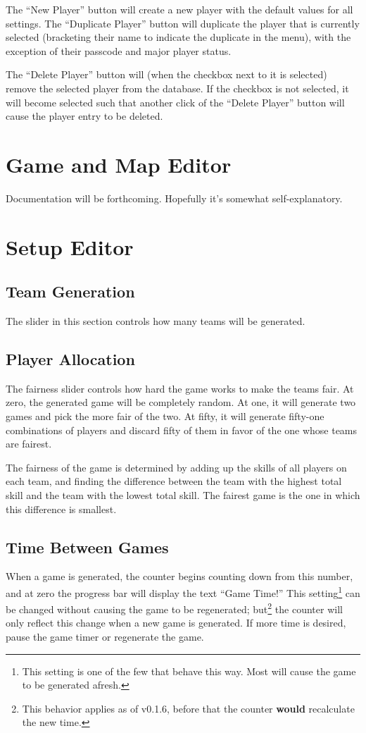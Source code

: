 \documentclass[pdftex,10pt,a4paper]{report}
\begin{document}
The ``New Player'' button will create a new player with the default values for all settings.  The ``Duplicate Player'' button will duplicate the player that is currently selected (bracketing their name to indicate the duplicate in the menu), with the exception of their passcode and major player status.

The ``Delete Player'' button will (when the checkbox next to it is selected) remove the selected player from the database.  If the checkbox is not selected, it will become selected such that another click of the ``Delete Player'' button will cause the player entry to be deleted.

\chapter{Game and Map Editor}
Documentation will be forthcoming.  Hopefully it's somewhat self-explanatory.

\chapter{Setup Editor}
\section{Team Generation}
The slider in this section controls how many teams will be generated.

\section{Player Allocation}
The fairness slider controls how hard the game works to make the teams fair.  At zero, the generated game will be completely random.  At one, it will generate two games and pick the more fair of the two.  At fifty, it will generate fifty-one combinations of players and discard fifty of them in favor of the one whose teams are fairest.

The fairness of the game is determined by adding up the skills of all players on each team, and finding the difference between the team with the highest total skill and the team with the lowest total skill.  The fairest game is the one in which this difference is smallest.

\section{Time Between Games}
When a game is generated, the counter begins counting down from this number, and at zero the progress bar will display the text ``Game Time!''  This setting\footnote{This setting is one of the few that behave this way.  Most will cause the game to be generated afresh.} can be changed without causing the game to be regenerated; but\footnote{This behavior applies as of v0.1.6, before that the counter \textbf{would} recalculate the new time.} the counter will only reflect this change when a new game is generated.  If more time is desired, pause the game timer or regenerate the game.
\end{document}
